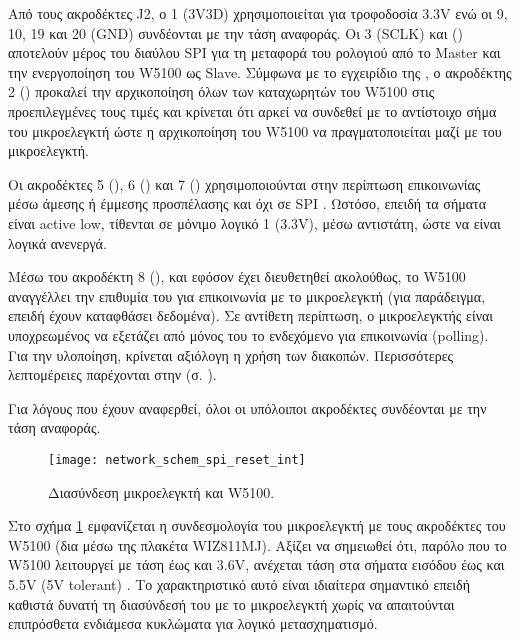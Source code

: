 Από τους ακροδέκτες J2, ο 1 (3V3D) χρησιμοποιείται για τροφοδοσία 3.3V ενώ οι
9, 10, 19 και 20 (GND) συνδέονται με την τάση αναφοράς. Οι 3 (SCLK) και
() αποτελούν μέρος του διαύλου SPI για τη μεταφορά του ρολογιού από
το \textenglish{Master} και την ενεργοποίηση του W5100 ως \textenglish{Slave}.
Σύμφωνα με το εγχειρίδιο της \textcite[8]{wiz13:811mj}, ο ακροδέκτης 2
() προκαλεί την αρχικοποίηση όλων των καταχωρητών του W5100 στις
προεπιλεγμένες τους τιμές και κρίνεται ότι αρκεί να συνδεθεί με το αντίστοιχο
σήμα του μικροελεγκτή ώστε η αρχικοποίηση του W5100 να πραγματοποιείται μαζί
με του μικροελεγκτή.

Οι ακροδέκτες 5 (), 6 () και 7 () χρησιμοποιούνται
στην περίπτωση επικοινωνίας μέσω άμεσης ή έμμεσης προσπέλασης και όχι σε SPI
\parencite[8]{wiz11:w5100}. Ωστόσο, επειδή τα σήματα είναι
\textenglish{active low}, τίθενται σε μόνιμο λογικό 1 (3.3V), μέσω αντιστάτη,
ώστε να είναι λογικά ανενεργά.

Μέσω του ακροδέκτη 8 (), και εφόσον έχει διευθετηθεί ακολούθως, το
W5100 αναγγέλλει την επιθυμία του για επικοινωνία με το μικροελεγκτή (για
παράδειγμα, επειδή έχουν καταφθάσει δεδομένα). Σε αντίθετη περίπτωση, ο
μικροελεγκτής είναι υποχρεωμένος να εξετάζει από μόνος του το ενδεχόμενο για
επικοινωνία (\textenglish{polling}). Για την υλοποίηση, κρίνεται αξιόλογη η
χρήση των διακοπών. Περισσότερες λεπτομέρειες παρέχονται στην
 (σ. \pageref{ssubsec:network:ir_imr}).

Για λόγους που έχουν αναφερθεί, όλοι οι υπόλοιποι ακροδέκτες συνδέονται με την
τάση αναφοράς.

\begin{figure}
    \caption{Διασύνδεση μικροελεγκτή και W5100.
    \label{fig:network:spi_reset_int}}
    \begin{center}
    \texttt{[image: network\_schem\_spi\_reset\_int]}
    \end{center}
\end{figure}

Στο σχήμα \ref{fig:network:spi_reset_int} εμφανίζεται η συνδεσμολογία του
μικροελεγκτή με τους ακροδέκτες του W5100 (δια μέσω της πλακέτα WIZ811MJ).
Αξίζει να σημειωθεί ότι, παρόλο που το W5100 λειτουργεί με τάση έως και 3.6V,
ανέχεται τάση στα σήματα εισόδου έως και 5.5V (\textenglish{5V tolerant})
\parencite[64]{wiz11:w5100}. Το χαρακτηριστικό αυτό είναι ιδιαίτερα σημαντικό
επειδή καθιστά δυνατή τη διασύνδεσή του με το μικροελεγκτή χωρίς να απαιτούνται
επιπρόσθετα ενδιάμεσα κυκλώματα για λογικό μετασχηματισμό. %


